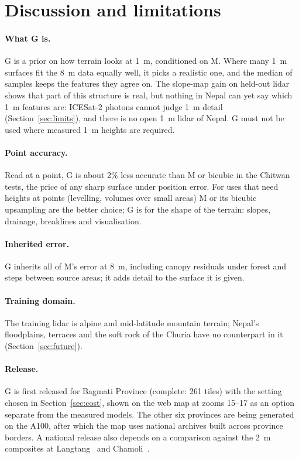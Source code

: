 \documentclass[11pt]{article}
\begin{document}
\section{Discussion and limitations}
\paragraph{What G is.} G is a prior on how terrain looks at 1~m, conditioned on M. Where many 1~m surfaces fit the
8~m data equally well, it picks a realistic one, and the median of samples keeps the features they agree on. The
slope-map gain on held-out lidar shows that part of this structure is real, but nothing in Nepal can yet say which 1~m
features are: ICESat-2 photons cannot judge 1~m detail (Section~\ref{sec:limits}), and there is no open 1~m lidar of
Nepal. G must not be used where measured 1~m heights are required.

\paragraph{Point accuracy.} Read at a point, G is about 2\% less accurate than M or bicubic in the Chitwan tests, the
price of any sharp surface under position error. For uses that need heights at points (levelling, volumes over small
areas) M or its bicubic upsampling are the better choice; G is for the shape of the terrain: slopes, drainage, breaklines
and visualisation.

\paragraph{Inherited error.} G inherits all of M's error at 8~m, including canopy residuals under forest and steps
between source areas; it adds detail to the surface it is given.

\paragraph{Training domain.} The training lidar is alpine and mid-latitude mountain terrain; Nepal's floodplains,
terraces and the soft rock of the Churia have no counterpart in it (Section~\ref{sec:future}).

\paragraph{Release.} G is first released for Bagmati Province (complete: 261 tiles) with the setting chosen in
Section~\ref{sec:cost}, shown on
the web map at zooms 15--17 as an option separate from the measured models. The other six provinces are being
generated on the A100, after which the map uses national archives built across province borders. A national release
also depends on a comparison against the 2~m composites at Langtang~\citep{shean2026langtang} and
Chamoli~\citep{bhushan2021chamoli}.
\end{document}
